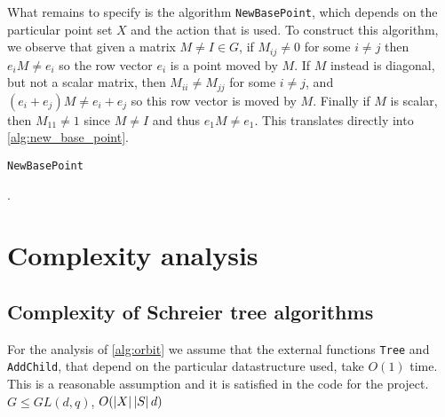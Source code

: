 What remains to specify is the algorithm \texttt{NewBasePoint}, which
depends on the particular point set $X$ and the action that is used.
To construct this algorithm, we observe that given a matrix $M \neq I
\in G$, if $M_{ij} \neq 0$ for some $i \neq j$ then $e_i M \neq e_i$
so the row vector $e_i$ is a point moved by $M$. If $M$ instead is
diagonal, but not a scalar matrix, then $M_{ii} \neq M_{jj}$ for some
$i \neq j$, and $(e_i + e_j) M \neq e_i + e_j$ so this row vector is
moved by $M$. Finally if $M$ is scalar, then $M_{11} \neq 1$ since $M
\neq I$ and thus $e_1 M \neq e_1$. This translates directly into \ref{alg:new_base_point}.

\begin{algorithm} 
\dontprintsemicolon
\caption{\texttt{NewBasePoint}}
.
\Begin
{
  {
    {
      {
      }
    }
  }
  {
    {
      {
      }
    }
  }
}
\label{alg:new_base_point}
\end{algorithm}

\section{Complexity analysis}

\subsection{Complexity of Schreier tree algorithms}
For the analysis of \ref{alg:orbit} we assume that the external
functions \texttt{Tree} and \texttt{AddChild}, that depend on the
particular datastructure used, take $O(1)$ time. This is a reasonable
assumption and it is satisfied in the code for the project. $G \leq
GL(d, q)$, $O(\left\lvert X \right\rvert \left\lvert S \right\rvert d)$

